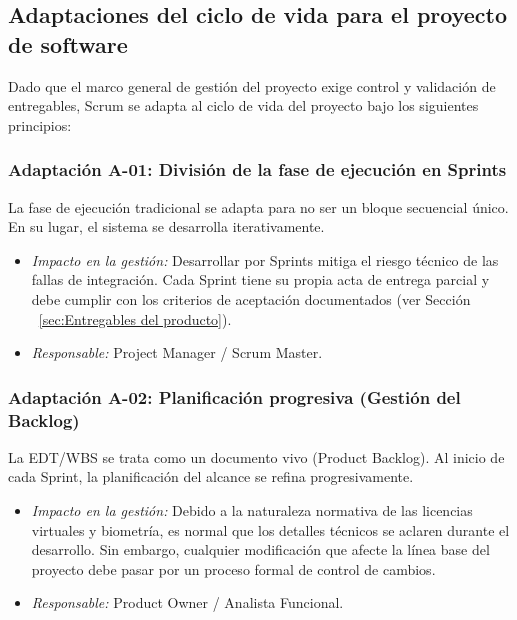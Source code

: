 \subsection{Adaptaciones del ciclo de vida para el proyecto de software}

Dado que el marco general de gestión del proyecto exige control y validación de entregables, Scrum se adapta al ciclo de vida del proyecto bajo los siguientes principios:

\subsubsection{Adaptación A-01: División de la fase de ejecución en Sprints}
La fase de ejecución tradicional se adapta para no ser un bloque secuencial único. En su lugar, el sistema se desarrolla iterativamente. 
\begin{itemize}
    \item \textit{Impacto en la gestión:} Desarrollar por Sprints mitiga el riesgo técnico de las fallas de integración. Cada Sprint tiene su propia acta de entrega parcial y debe cumplir con los criterios de aceptación documentados (ver Sección ~\ref{sec:Entregables del producto}).
    \item \textit{Responsable:} Project Manager / Scrum Master.
\end{itemize}

\subsubsection{Adaptación A-02: Planificación progresiva (Gestión del Backlog)}
La EDT/WBS se trata como un documento vivo (Product Backlog). Al inicio de cada Sprint, la planificación del alcance se refina progresivamente.
\begin{itemize}
    \item \textit{Impacto en la gestión:} Debido a la naturaleza normativa de las licencias virtuales y biometría, es normal que los detalles técnicos se aclaren durante el desarrollo. Sin embargo, cualquier modificación que afecte la línea base del proyecto debe pasar por un proceso formal de control de cambios.
    \item \textit{Responsable:} Product Owner / Analista Funcional.
\end{itemize}

